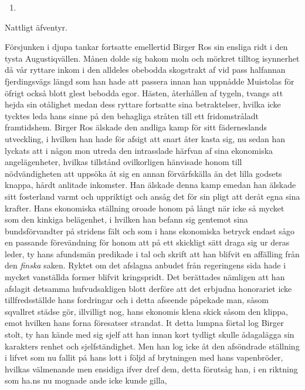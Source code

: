 \begin{enumerate}
\def\labelenumi{\arabic{enumi}.}
\setcounter{enumi}{18}
\tightlist
\item
\end{enumerate}

Nattligt äfventyr.

Försjunken i djupa tankar fortsatte emellertid Birger Ros sin ensliga
ridt i den tysta Augustiqvällen. Månen dolde sig bakom moln och mörkret
tilltog isynnerhet då vår ryttare inkom i den alldeles obebodda
skogstrakt af vid pass halfannan fjerdingsvägs längd som han hade att
passera innan han uppnådde Muistolas för öfrigt också blott glest
bebodda egor. Hästen, återhållen af tygeln, tvangs att hejda sin
otålighet medan dess ryttare fortsatte sina betraktelser, hvilka icke
tycktes leda hans sinne på den behagliga stråten till ett fridomstråladt
framtidshem. Birger Ros älskade den andliga kamp för sitt fäderneslands
utveckling, i hvilken han hade för afsigt att snart åter kasta sig, nu
sedan han lyckats att i någon mon utreda den intrasslade härfvan af sina
ekonomiska angelägenheter, hvilkas tillstånd ovilkorligen hänvisade
honom till nödvändigheten att uppsöka åt sig en annan förvärfskälla än
det lilla godsets knappa, hårdt anlitade inkomster. Han älskade denna
kamp emedan han älskade sitt fosterland varmt och uppriktigt och ansåg
det för sin pligt att deråt egna sina krafter. Hans ekonomiska ställning
oroade honom på långt när icke så mycket som den kinkiga belägenhet, i
hvilken han befann sig gentemot sina bundsförvandter på stridens fält
och som i hans ekonomiska betryck endast sågo en passande förevändning
för honom att på ett skickligt sätt draga sig ur deras leder, ty hans
afundsmän predikade i tal och skrift att han blifvit en affälling från
den \emph{finska} saken. Ryktet om det afslagna anbudet från regeringens
sida hade i mycket vanställda former blifvit kringspridt. Det berättades
nämligen att han afslagit detsamma hufvudsakligen blott derföre att det
erbjudna honorariet icke tillfredsställde hans fordringar och i detta
afseende påpekade man, såsom sqvallret städse gör, illvilligt nog, hans
ekonomis klena skick såsom den klippa, emot hvilken hans forna
föresatser strandat. It detta lumpna förtal log Birger stolt, ty han
kände med sig sjelf att han innan kort tydligt skulle ådagalägga sin
karakters renhet och sjelfständighet. Men han log icke åt den afsöndrade
ställning i lifvet som nu fallit på hans lott i följd af brytningen med
hans vapenbröder, hvilkas välmenande men ensidiga ifver dref dem, detta
förutsåg han, i en riktning som ha.ns nu mognade ande icke kunde gilla,
